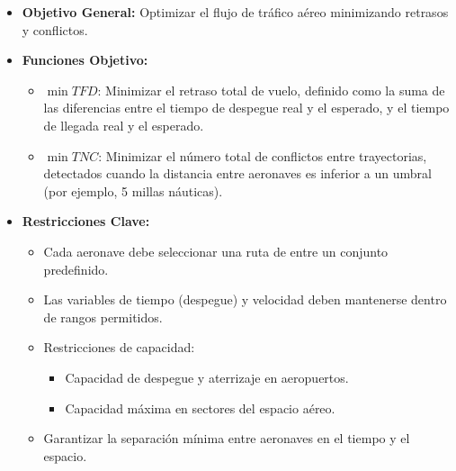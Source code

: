 \begin{frame}{\parencite{Guo_2024_CCDF} }{}
    \begin{itemize}
        \item \textbf{Objetivo General:}
              Optimizar el flujo de tráfico aéreo minimizando retrasos y conflictos.
        \item \textbf{Funciones Objetivo:}
              \begin{itemize}
                  \item \(\min TFD\): Minimizar el retraso total de vuelo, definido como la suma de las diferencias entre el tiempo de despegue real y el esperado, y el tiempo de llegada real y el esperado.
                  \item \(\min TNC\): Minimizar el número total de conflictos entre trayectorias, detectados cuando la distancia entre aeronaves es inferior a un umbral (por ejemplo, 5 millas náuticas).
              \end{itemize}
    \end{itemize}
\end{frame}
\begin{frame}{\parencite{Guo_2024_CCDF} }{}
    \begin{itemize}
        \item \textbf{Restricciones Clave:}
              \begin{itemize}
                  \item Cada aeronave debe seleccionar una ruta de entre un conjunto predefinido.
                  \item Las variables de tiempo (despegue) y velocidad deben mantenerse dentro de rangos permitidos.
                  \item Restricciones de capacidad:
                        \begin{itemize}
                            \item Capacidad de despegue y aterrizaje en aeropuertos.
                            \item Capacidad máxima en sectores del espacio aéreo.
                        \end{itemize}
                  \item Garantizar la separación mínima entre aeronaves en el tiempo y el espacio.
              \end{itemize}
    \end{itemize}
\end{frame}

